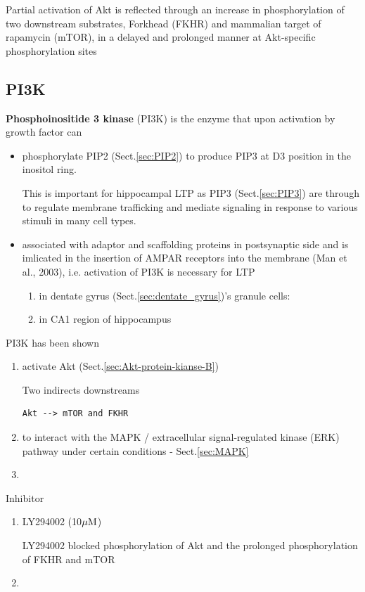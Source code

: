 Partial activation of Akt is reflected through an increase in phosphorylation of
two downstream substrates, Forkhead (FKHR) and mammalian target of rapamycin
(mTOR), in a delayed and prolonged manner at Akt-specific phosphorylation sites


\subsection{PI3K}
\label{sec:PI3K}

{\bf Phosphoinositide 3 kinase}  (PI3K) is the enzyme that upon activation by
growth factor can 
\begin{itemize}
  
  \item phosphorylate PIP2 (Sect.\ref{sec:PIP2}) to produce PIP3
  at D3 position in the inositol ring.
  
  This is important for hippocampal LTP as PIP3 (Sect.\ref{sec:PIP3}) are
  through to regulate membrane trafficking and mediate signaling in response to
  various stimuli in many cell types.
  
  \item associated with adaptor and scaffolding proteins in postsynaptic side
  and is imlicated in the insertion of AMPAR receptors into the membrane (Man
  et al., 2003), i.e. activation of PI3K is necessary for LTP 
  \begin{enumerate}
    \item in dentate gyrus (Sect.\ref{sec:dentate_gyrus})'s granule cells:
    \item in CA1 region of hippocampus 
  \end{enumerate}
\end{itemize}

PI3K has been shown 
\begin{enumerate}
  \item activate Akt (Sect.\ref{sec:Akt-protein-kianse-B})

Two indirects downstreams  
\begin{verbatim}
Akt --> mTOR and FKHR
\end{verbatim}


  \item to interact with the MAPK / extracellular signal-regulated
kinase (ERK) pathway under certain conditions - Sect.\ref{sec:MAPK}
  \item 
\end{enumerate}

Inhibitor
\begin{enumerate}
  \item LY294002 (10${\mu\text{M}}$)

LY294002  blocked phosphorylation of Akt and the prolonged phosphorylation of
FKHR and mTOR

  \item 
\end{enumerate}

